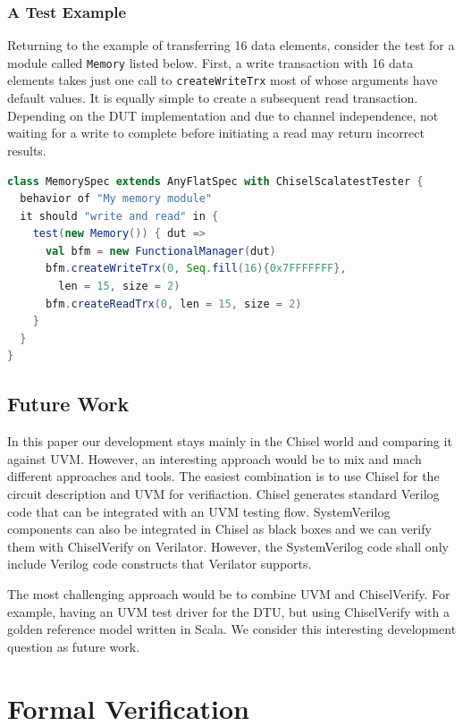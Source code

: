 \documentclass[conference]{IEEEtran}
\begin{document}
\subsubsection{A Test Example}
Returning to the example of transferring 16 data elements, consider the test for a module called \texttt{Memory} listed below. First, a write transaction with 16 data elements takes just one call to \texttt{createWriteTrx} most of whose arguments have default values. It is equally simple to create a subsequent read transaction. Depending on the DUT implementation and due to channel independence, not waiting for a write to complete before initiating a read may return incorrect results.
\begin{lstlisting}[language=scala, caption={Using the AXI4 bus functional model with ChiselTest}, label={lst:axitest}]
class MemorySpec extends AnyFlatSpec with ChiselScalatestTester {
  behavior of "My memory module"
  it should "write and read" in {
    test(new Memory()) { dut =>
      val bfm = new FunctionalManager(dut)
      bfm.createWriteTrx(0, Seq.fill(16){0x7FFFFFFF}, 
        len = 15, size = 2)
      bfm.createReadTrx(0, len = 15, size = 2)
    }
  }
}
\end{lstlisting}

\subsection{Future Work}

In this paper our development stays mainly in the Chisel world and comparing it against UVM.
However, an interesting approach would be to mix and mach different approaches and tools.
The easiest combination is to use Chisel for the circuit description and UVM for verifiaction.
Chisel generates standard Verilog code that can be integrated with an UVM testing flow.
SystemVerilog components can also be integrated in Chisel as black boxes and we can
verify them with ChiselVerify on Verilator. However, the SystemVerilog code shall only
include Verilog code constructs that Verilator supports.

The most challenging approach would be to combine UVM and ChiselVerify. For example,
having an UVM test driver for the DTU, but using ChiselVerify with a golden reference
model written in Scala. We consider this interesting development question as future work.


\section{Formal Verification}
\label{sec:formal}
\end{document}
